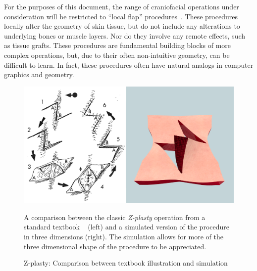 For the purposes of this document, the range of craniofacial
operations under consideration will be restricted to ``local flap''
procedures~\citep{Baker:2014}. These procedures locally alter the
geometry of skin tissue, but do not include any alterations to
underlying bones or muscle layers. Nor do they involve any remote
effects, such as tissue grafts. These procedures are fundamental
building blocks of more complex operations, but, due to their often
non-intuitive geometry, can be difficult to learn. In fact, these
procedures often have natural analogs in computer graphics and
geometry.

\begin{figure}
  \includegraphics[width=\textwidth]{chapter_gridiron/images/zPlastyComparison.png}
  \vspace*{-.05in}
  \caption{Z-plasty: Comparison between textbook illustration and simulation}{A
    comparison between the classic \textit{Z-plasty} operation from a standard
    textbook ~\citep{McCarthy1990} (left) and a simulated version of the procedure
    in three dimensions (right). The simulation allows for
    more of the three dimensional shape of the procedure to be
    appreciated.}
  \vspace*{-.05in}
  \label{fig:ZPlastyComparison}
\end{figure}

